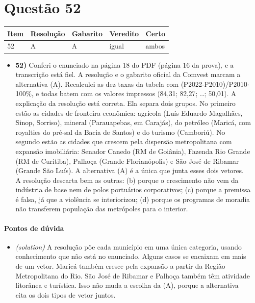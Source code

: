 \documentclass{article}%
\begin{document}
\section*{Questão 52}%
\begin{longtable}{@{}p{} p{} p{} p{} p{}@{}}\toprule Item & Resolução & Gabarito & Veredito & Certo \\ \midrule
52 & A & A & igual & ambos \\
\bottomrule\end{longtable}%
\begin{itemize}%
\item%
\textbf{52)} Conferi o enunciado na página 18 do PDF (página 16 da prova), e a transcrição está fiel. A resolução e o gabarito oficial da Comvest marcam a alternativa (A). Recalculei as dez taxas da tabela com (P2022-P2010)/P2010$\cdot$100\%, e todas batem com os valores impressos (84,31; 82,27; \ldots{}; 50,01). A explicação da resolução está correta. Ela separa dois grupos. No primeiro estão as cidades de fronteira econômica: agrícola (Luís Eduardo Magalhães, Sinop, Sorriso), mineral (Parauapebas, em Carajás), do petróleo (Maricá, com royalties do pré{-}sal da Bacia de Santos) e do turismo (Camboriú). No segundo estão as cidades que crescem pela dispersão metropolitana com expansão imobiliária: Senador Canedo (RM de Goiânia), Fazenda Rio Grande (RM de Curitiba), Palhoça (Grande Florianópolis) e São José de Ribamar (Grande São Luís). A alternativa (A) é a única que junta esses dois vetores. A resolução descarta bem as outras: (b) porque o crescimento não vem da indústria de base nem de polos portuários corporativos; (c) porque a premissa é falsa, já que a violência se interiorizou; (d) porque os programas de moradia não transferem população das metrópoles para o interior.%
\end{itemize}%
\paragraph{Pontos de dúvida}%
\begin{itemize}%
\item%
\textit{(solution)} A resolução põe cada município em uma única categoria, usando conhecimento que não está no enunciado. Alguns casos se encaixam em mais de um vetor. Maricá também cresce pela expansão a partir da Região Metropolitana do Rio. São José de Ribamar e Palhoça também têm atividade litorânea e turística. Isso não muda a escolha da (A), porque a alternativa cita os dois tipos de vetor juntos.%
\end{itemize}%
\end{document}
